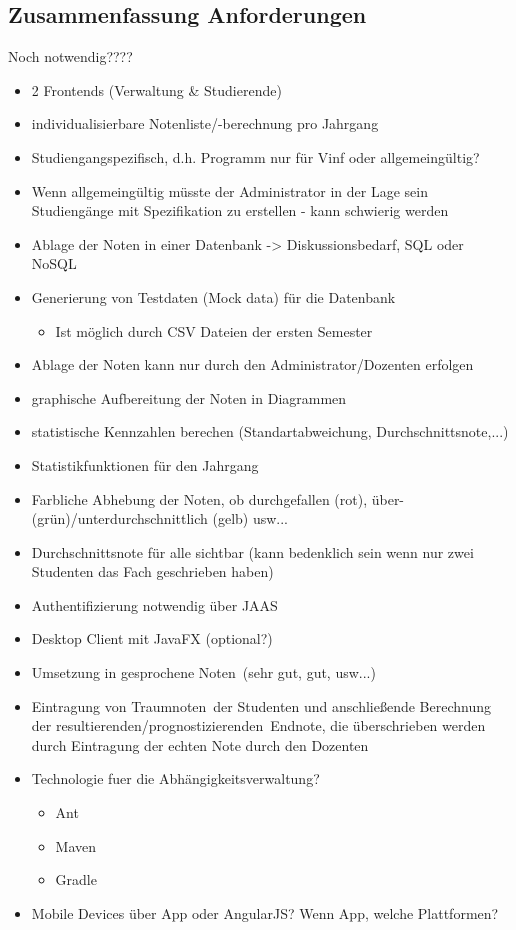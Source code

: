\documentclass[12pt,a4paper,parskip]{scrreprt}
\begin{document}
\subsection{Zusammenfassung Anforderungen}
Noch notwendig????
\begin{itemize}
\item 2 Frontends (Verwaltung \& Studierende)
\item individualisierbare Notenliste/-berechnung pro Jahrgang
\item Studiengangspezifisch, d.h. Programm nur für Vinf oder allgemeingültig?
\item Wenn allgemeingültig müsste der Administrator in der Lage sein Studiengänge mit Spezifikation zu erstellen - kann schwierig werden

\item Ablage der Noten in einer Datenbank -> Diskussionsbedarf, SQL oder NoSQL
\item Generierung von Testdaten (Mock data) für die Datenbank
\begin{itemize}
	\item Ist möglich durch CSV Dateien der ersten Semester
\end{itemize}
\item Ablage der Noten kann nur durch den Administrator/Dozenten erfolgen
\item graphische Aufbereitung der Noten in Diagrammen
\item statistische Kennzahlen berechen (Standartabweichung, Durchschnittsnote,...)
\item Statistikfunktionen für den Jahrgang
\item Farbliche Abhebung der Noten, ob durchgefallen (rot), über- (grün)/unterdurchschnittlich (gelb) usw...
\item Durchschnittsnote für alle sichtbar (kann bedenklich sein wenn nur zwei Studenten das Fach geschrieben haben)
\item Authentifizierung notwendig über JAAS
\item Desktop Client mit JavaFX (optional?)
\item Umsetzung in \glqq gesprochene Noten\grqq\ (sehr gut, gut, usw...)
\item Eintragung von \glqq Traumnoten\grqq\ der Studenten und anschließende Berechnung der \glqq resultierenden/prognostizierenden\grqq\ Endnote, die überschrieben werden durch Eintragung der echten Note durch den Dozenten
\item Technologie fuer die Abhängigkeitsverwaltung?
\begin{itemize}
\item Ant
\item Maven
\item Gradle
\end{itemize}
\item Mobile Devices über App oder AngularJS? Wenn App, welche Plattformen?
\end{itemize}
\end{document}
